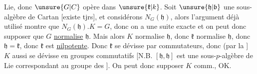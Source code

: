 Lie, donc $\unsure{G|C}$ opère dans $\unsure{\mathfrak{k}|k}$. Soit $\unsure{\mathfrak{h}|\mathfrak{b}}$ une sous-algèbre de Cartan [existe tjrs], et considérons $N_G(\mathfrak{h})$, alors l'argument déjà utilisé montre que $N_G(\mathfrak{h}).K=G$, donc on  a une suite exacte
et on peut donc supposer que $G$ \uline{normalise} $\mathfrak{h}$. Mais alors $K$ normalise $\mathfrak{h}$, donc $\mathfrak{k}$ normalise $\mathfrak{h}$, donc $\mathfrak{h}=\mathfrak{k}$, donc $\mathfrak{k}$ est \uline{nilpotente}. Donc $\mathfrak{k}$ se dévisse  par commutateurs, donc (par la  ] $K$ aussi se dévisse en groupes commutatifs [N.B. $[\mathfrak{h},\mathfrak{h}]$ est une sous-$p$-algèbre de Lie   correspondant au groupe des ]. On peut donc supposer $K$ comm., OK.

